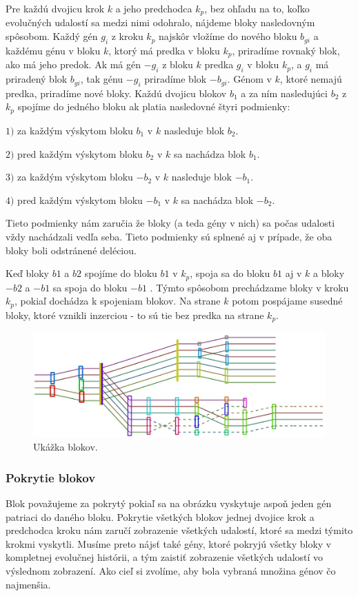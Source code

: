 Pre každú dvojicu krok $k$ a jeho predchodca $k_p$, bez ohľadu na to, koľko evolučných udalostí sa medzi nimi odohralo, nájdeme bloky nasledovným spôsobom.
Každý gén $g_i$ z kroku $k_p$ najskôr vložíme do nového bloku $b_{gi}$ a každému génu v bloku $k$, ktorý má predka v bloku $k_p$, priradíme rovnaký blok, ako má jeho predok.
Ak má gén $-g_i$ z bloku $k$ predka $g_i$ v bloku $k_p$, a $g_i$ má priradený blok $b_{gi}$, tak génu $-g_i$ priradíme blok $-b_{gi}$. 
Génom v $k$, ktoré nemajú predka, priradíme nové bloky.
Každú dvojicu blokov $b_1$ a za ním nasledujúci $b_2$ z $k_p$ spojíme do jedného bloku ak platia nasledovné štyri podmienky:

$1)$ za každým výskytom bloku $b_1$ v $k$ nasleduje blok $b_2$.

$2)$ pred každým výskytom bloku $b_2$ v $k$ sa nachádza blok $b_1$.

$3)$ za každým výskytom bloku $-b_2$ v $k$ nasleduje blok $-b_1$.

$4)$ pred každým výskytom bloku $-b_1$ v $k$ sa nachádza blok $-b_2$.

Tieto podmienky nám zaručia že bloky (a teda gény v nich) sa počas udalosti vždy nachádzali vedľa seba.
Tieto podmienky sú splnené aj v prípade, že oba bloky boli odstránené deléciou.

Keď bloky $b1$ a $b2$ spojíme do bloku $b1$ v $k_p$, spoja sa do bloku $b1$ aj v $k$ a bloky $-b2$ a $-b1$ sa spoja do bloku $-b1$ .
Týmto spôsobom prechádzame bloky v kroku $k_p$, pokiaľ dochádza k spojeniam blokov. Na strane $k$ potom pospájame susedné bloky,
ktoré vznikli inzerciou - to sú tie bez predka na strane $k_p$.

\begin{figure}[t]
 \centering
\includegraphics[width=1\textwidth]{images/bloky}
\caption{Ukážka blokov.}\label{obr:bloky}
\end{figure}


\subsubsection{Pokrytie blokov}
Blok považujeme za pokrytý pokiaľ sa na obrázku vyskytuje aspoň jeden gén patriaci do daného bloku.
Pokrytie všetkých blokov jednej dvojice krok a predchodca kroku nám zaručí zobrazenie všetkých udalostí, ktoré sa medzi týmito krokmi vyskytli.
Musíme preto nájsť také gény, ktoré pokryjú všetky bloky v kompletnej evolučnej histórii,
a tým zaistiť zobrazenie všetkých udalostí vo výslednom zobrazení. 
Ako cieľ si zvolíme, aby bola vybraná množina génov čo najmenšia.
